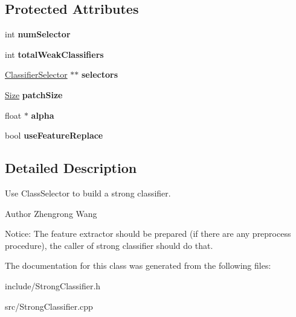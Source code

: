 \subsection*{Protected Attributes}
\begin{DoxyCompactItemize}
\item 
\hypertarget{classStrongClassifier_ac28de5f3c7dd577833b322f5c2125545}{}int {\bfseries num\+Selector}\label{classStrongClassifier_ac28de5f3c7dd577833b322f5c2125545}

\item 
\hypertarget{classStrongClassifier_adb955a679fec4cc9dc30710381a27e11}{}int {\bfseries total\+Weak\+Classifiers}\label{classStrongClassifier_adb955a679fec4cc9dc30710381a27e11}

\item 
\hypertarget{classStrongClassifier_ad3bcc8911e2308b74f155c09883ac8f2}{}\hyperlink{classClassifierSelector}{Classifier\+Selector} $\ast$$\ast$ {\bfseries selectors}\label{classStrongClassifier_ad3bcc8911e2308b74f155c09883ac8f2}

\item 
\hypertarget{classStrongClassifier_a5f1728b5858ee6db12c796664218278a}{}\hyperlink{classSize}{Size} {\bfseries patch\+Size}\label{classStrongClassifier_a5f1728b5858ee6db12c796664218278a}

\item 
\hypertarget{classStrongClassifier_a57a7599a5b0e2c86e14441f313d0f934}{}float $\ast$ {\bfseries alpha}\label{classStrongClassifier_a57a7599a5b0e2c86e14441f313d0f934}

\item 
\hypertarget{classStrongClassifier_a1115a457d942f20ed7d63325192ff283}{}bool {\bfseries use\+Feature\+Replace}\label{classStrongClassifier_a1115a457d942f20ed7d63325192ff283}

\end{DoxyCompactItemize}


\subsection{Detailed Description}
Use Class\+Selector to build a strong classifier. \begin{DoxyAuthor}{Author}
Zhengrong Wang
\end{DoxyAuthor}
Notice\+: The feature extractor should be prepared (if there are any preprocess procedure), the caller of strong classifier should do that. 

The documentation for this class was generated from the following files\+:\begin{DoxyCompactItemize}
\item 
include/Strong\+Classifier.\+h\item 
src/Strong\+Classifier.\+cpp\end{DoxyCompactItemize}
